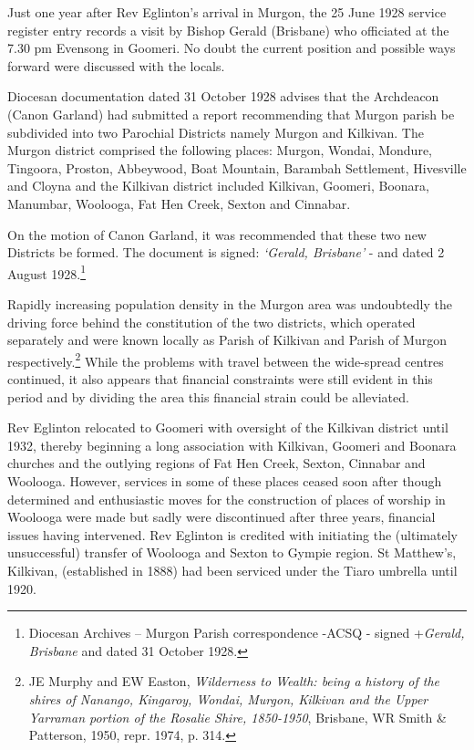 Just one year after Rev Eglinton's arrival in Murgon, the 25 June 1928 service register entry records a visit by Bishop Gerald (Brisbane) who officiated at the 7.30 pm Evensong in Goomeri. No doubt the current position and possible ways forward were discussed with the locals.



Diocesan documentation dated 31 October 1928 advises that the Archdeacon (Canon Garland) had submitted a report recommending that Murgon parish be subdivided into two Parochial Districts namely Murgon and Kilkivan. The Murgon district comprised the following places: Murgon, Wondai, Mondure, Tingoora, Proston, Abbeywood, Boat Mountain, Barambah Settlement, Hivesville and Cloyna and the Kilkivan district included Kilkivan, Goomeri, Boonara, Manumbar, Woolooga, Fat Hen Creek, Sexton and Cinnabar.



On the motion of Canon Garland, it was recommended that these two new Districts be formed. The document is signed: \emph{`Gerald, Brisbane'} - and dated 2 August 1928.\footnote{Diocesan Archives -- Murgon Parish correspondence -ACSQ - signed +\emph{Gerald, Brisbane} and dated 31 October 1928.}


Rapidly increasing population density in the Murgon area was undoubtedly the driving force behind the constitution of the two districts, which operated separately and were known locally as Parish of Kilkivan and Parish of Murgon respectively.\footnote{JE Murphy and EW Easton, \emph{Wilderness to Wealth: being a history of the shires of Nanango, Kingaroy, Wondai, Murgon, Kilkivan and the Upper Yarraman portion of the Rosalie Shire, 1850-1950}, Brisbane, WR Smith \& Patterson, 1950, repr. 1974, p. 314.} While the problems with travel between the wide-spread centres continued, it also appears that financial constraints were still evident in this period and by dividing the area this financial strain could be alleviated.


Rev Eglinton relocated to Goomeri with oversight of the Kilkivan district until 1932, thereby beginning a long association with Kilkivan, Goomeri and Boonara churches and the outlying regions of Fat Hen Creek, Sexton, Cinnabar and Woolooga. However, services in some of these places ceased soon after though determined and enthusiastic moves for the construction of places of worship in Woolooga were made but sadly were discontinued after three years, financial issues having intervened. Rev Eglinton is credited with initiating the (ultimately unsuccessful) transfer of Woolooga and Sexton to Gympie region. St Matthew's, Kilkivan, (established in 1888) had been serviced under the Tiaro umbrella until 1920.



